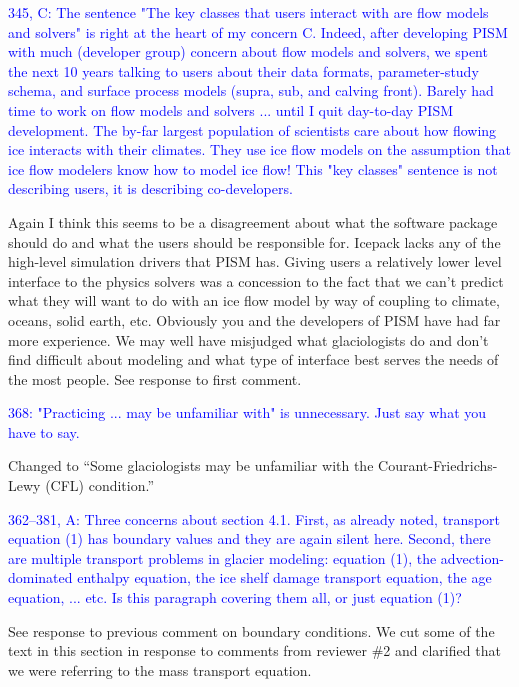 \documentclass{article}
\theoremstyle{definition}
\theoremstyle{plain}
\begin{document}
\textcolor{blue}{345, C:  The sentence "The key classes that users interact with are flow models and solvers" is right at the heart of my concern C.  Indeed, after developing PISM with much (developer group) concern about flow models and solvers, we spent the next 10 years talking to users about their data formats, parameter-study schema, and surface process models (supra, sub, and calving front).  Barely had time to work on flow models and solvers ... until I quit day-to-day PISM development.  The by-far largest population of scientists care about how flowing ice interacts with their climates.  They use ice flow models on the assumption that ice flow modelers know how to model ice flow!  This "key classes" sentence is not describing users, it is describing co-developers.}

Again I think this seems to be a disagreement about what the software package should do and what the users should be responsible for.
Icepack lacks any of the high-level simulation drivers that PISM has.
Giving users a relatively lower level interface to the physics solvers was a concession to the fact that we can't predict what they will want to do with an ice flow model by way of coupling to climate, oceans, solid earth, etc.
Obviously you and the developers of PISM have had far more experience.
We may well have misjudged what glaciologists do and don't find difficult about modeling and what type of interface best serves the needs of the most people.
See response to first comment.

\textcolor{blue}{368:  "Practicing ... may be unfamiliar with" is unnecessary.  Just say what you have to say.}

Changed to ``Some glaciologists may be unfamiliar with the Courant-Friedrichs-Lewy (CFL) condition.''

\textcolor{blue}{362--381, A:  Three concerns about section 4.1.  First, as already noted, transport equation (1) has boundary values and they are again silent here.  Second, there are multiple transport problems in glacier modeling: equation (1), the advection-dominated enthalpy equation, the ice shelf damage transport equation, the age equation, ... etc.  Is this paragraph covering them all, or just equation (1)?}

See response to previous comment on boundary conditions.
We cut some of the text in this section in response to comments from reviewer \#2 and clarified that we were referring to the mass transport equation.
\end{document}
